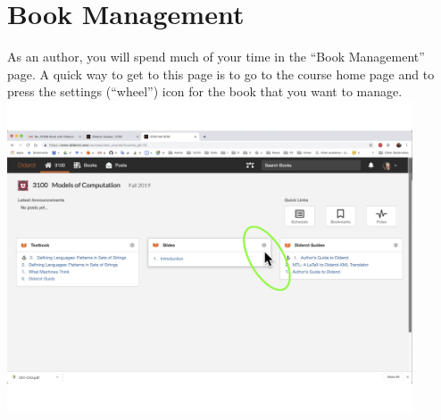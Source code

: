\section{Book Management}

\begin{gram}
\label{guide::author::go-book-management}
As an author, you will spend much of your time in the ``Book Management'' page.
A quick way to get to this page is to go to the course home page and to press the settings (``wheel'') icon for the book that you want to manage.
%
\includegraphics[width=0.9\textwidth]{author/media/go-to-book-management.jpg}
\end{gram}


